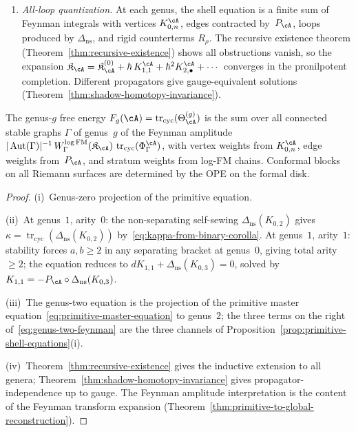 \begin{theorem}
\begin{enumerate}[label=\textup{(\roman*)}]
  $\Delta_{\mathrm{ns}}(K_1)$, the dumbbell
  $\frac{1}{2}[K_1, K_1]$, and the planted-forest counterterm
  $\sum R_\rho(K_{0,2})$, each contracted with~$P_\cA$.
\item \emph{All-loop quantization.}
  At each genus, the shell equation is a finite sum of
  Feynman integrals with vertices $K_{0,n}^\cA$, edges
  contracted by~$P_\cA$, loops produced by
  $\Delta_{\mathrm{ns}}$, and rigid counterterms $R_\rho$.
  The recursive existence theorem
  \textup{(}Theorem~\textup{\ref{thm:recursive-existence})}
  shows all obstructions vanish, so the expansion
  $\mathfrak{K}_\cA = \mathfrak{K}_\cA^{(0)}
  + \hbar\,K_{1,1}^\cA + \hbar^2 K_{2,\bullet}^\cA + \cdots$
  converges in the pronilpotent completion.
  Different propagators give gauge-equivalent solutions
  \textup{(}Theorem~\textup{\ref{thm:shadow-homotopy-invariance})}.
\end{enumerate}
The genus-$g$ free energy
$F_g(\cA) = \operatorname{tr}_{\mathrm{cyc}}(\Theta_\cA^{(g)})$
is the sum over all connected stable graphs $\Gamma$ of
genus~$g$ of the Feynman amplitude
$|\operatorname{Aut}(\Gamma)|^{-1}\,
W_\Gamma^{\log\mathrm{FM}}(\mathfrak{K}_\cA)\,
\operatorname{tr}_{\mathrm{cyc}}(\Phi_\Gamma^\cA)$,
with vertex weights from $K_{0,n}^\cA$, edge weights
from~$P_\cA$, and stratum weights from log-FM chains.
Conformal blocks on all Riemann surfaces are determined by
the OPE on the formal disk.
\end{theorem}

\begin{proof}
(i)~Genus-zero projection of the primitive equation.

(ii)~At genus~$1$, arity~$0$: the non-separating self-sewing
$\Delta_{\mathrm{ns}}(K_{0,2})$ gives
$\kappa = \operatorname{tr}_{\mathrm{cyc}}
(\Delta_{\mathrm{ns}}(K_{0,2}))$
by~\eqref{eq:kappa-from-binary-corolla}.
At genus~$1$, arity~$1$: stability forces $a, b \geq 2$ in any
separating bracket at genus~$0$, giving total arity~$\geq 2$;
the equation reduces to
$dK_{1,1} + \Delta_{\mathrm{ns}}(K_{0,3}) = 0$, solved by
$K_{1,1} = -P_\cA \circ \Delta_{\mathrm{ns}}(K_{0,3})$.

(iii)~The genus-two equation is the projection of
the primitive master equation~\eqref{eq:primitive-master-equation} to
genus~$2$; the three terms on the right of~\eqref{eq:genus-two-feynman}
are the three channels of
Proposition~\ref{prop:primitive-shell-equations}(i).

(iv)~Theorem~\ref{thm:recursive-existence} gives the
inductive extension to all genera;
Theorem~\ref{thm:shadow-homotopy-invariance} gives
propagator-independence up to gauge.  The Feynman amplitude
interpretation is the content of the Feynman transform expansion
(Theorem~\ref{thm:primitive-to-global-reconstruction}).
\end{proof}

